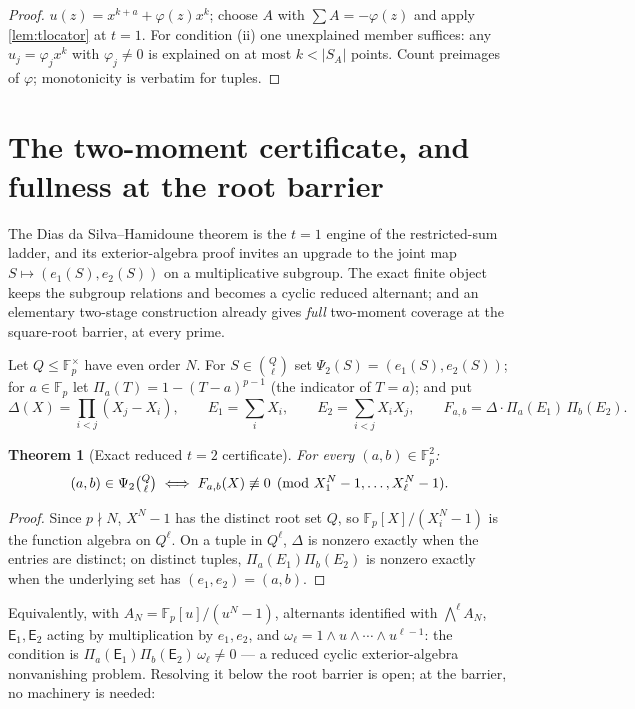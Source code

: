 \documentclass[11pt]{article}
\newtheorem{theorem}{Theorem}[section]
\theoremstyle{definition}
\newcommand{\F}{\mathbb F}
\begin{document}
\begin{proof}
$u(z)=x^{k+a}+\varphi(z)x^k$; choose $A$ with $\sum A=-\varphi(z)$ and apply \cref{lem:tlocator} at $t=1$.  For condition (ii) one unexplained member suffices: any $u_j=\varphi_jx^k$ with $\varphi_j\ne0$ is explained on at most $k<|S_A|$ points.  Count preimages of $\varphi$; monotonicity is verbatim for tuples.
\end{proof}

\section{The two-moment certificate, and fullness at the root barrier}\label{sec:twomoment}

The Dias da Silva--Hamidoune theorem is the $t=1$ engine of the restricted-sum ladder, and its exterior-algebra proof invites an upgrade to the joint map $S\mapsto(e_1(S),e_2(S))$ on a multiplicative subgroup.  The exact finite object keeps the subgroup relations and becomes a cyclic reduced alternant; and an elementary two-stage construction already gives \emph{full} two-moment coverage at the square-root barrier, at every prime.

Let $Q\le\F_p^\times$ have even order $N$.  For $S\in\binom Q\ell$ set $\Psi_2(S)=(e_1(S),e_2(S))$; for $a\in\F_p$ let $\Pi_a(T)=1-(T-a)^{p-1}$ (the indicator of $T=a$); and put
\[
        \Delta(X)=\prod_{i<j}(X_j-X_i),\qquad E_1=\sum_iX_i,\qquad E_2=\sum_{i<j}X_iX_j,
        \qquad F_{a,b}=\Delta\cdot\Pi_a(E_1)\,\Pi_b(E_2).
\]

\begin{theorem}[Exact reduced $t=2$ certificate]\label{thm:certificate}
For every $(a,b)\in\F_p^2$:
\[
        (a,b)\in\Psi_2\tbinom Q\ell
        \iff
        F_{a,b}(X)\not\equiv0\pmod{X_1^N-1,\dots,X_\ell^N-1}.
\]
\end{theorem}

\begin{proof}
Since $p\nmid N$, $X^N-1$ has the distinct root set $Q$, so $\F_p[X]/(X_i^N-1)$ is the function algebra on $Q^\ell$.  On a tuple in $Q^\ell$, $\Delta$ is nonzero exactly when the entries are distinct; on distinct tuples, $\Pi_a(E_1)\Pi_b(E_2)$ is nonzero exactly when the underlying set has $(e_1,e_2)=(a,b)$.
\end{proof}

Equivalently, with $A_N=\F_p[u]/(u^N-1)$, alternants identified with $\bigwedge^\ell A_N$, $\mathsf E_1,\mathsf E_2$ acting by multiplication by $e_1,e_2$, and $\omega_\ell=1\wedge u\wedge\cdots\wedge u^{\ell-1}$: the condition is $\Pi_a(\mathsf E_1)\Pi_b(\mathsf E_2)\,\omega_\ell\ne0$ --- a reduced cyclic exterior-algebra nonvanishing problem.  Resolving it below the root barrier is open; at the barrier, no machinery is needed:
\end{document}
